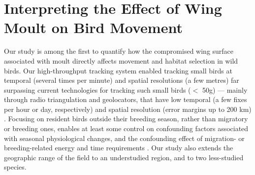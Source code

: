 
\section*{Interpreting the Effect of Wing Moult on Bird Movement}

Our study is among the first to quantify how the compromised wing surface associated with moult directly affects movement and habitat selection in wild birds.
Our high-throughput tracking system enabled tracking small birds at temporal (several times per minute) and spatial resolutions (a few metres) far surpassing current technologies for tracking such small birds ($<$ 50g) --- mainly through radio triangulation and geolocators, that have low temporal (a few fixes per hour or day, respectively) and spatial resolution (error margins up to 200 km) \citep{bridge2013}.
Focusing on resident birds outside their breeding season, rather than migratory or breeding ones, enables at least some control on confounding factors associated with seasonal physiological changes, and the confounding effect of migration- or breeding-related energy and time requirements \cite{alerstam1990,wikelski2003,horvitz2014}.
Our study also extends the geographic range of the field to an understudied region, and to two less-studied species.

